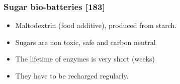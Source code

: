 \documentclass[a4paper,11pt,handout]{beamer}
\begin{document}
\begin{frame}
\frametitle{Sugar bio-batteries [183]}

\begin{itemize}

	\item Maltodextrin (food additive), produced from starch.
	\item Sugars are non toxic, safe and carbon neutral
	\item The lifetime of enzymes is very short (weeks)
	\item They have to be recharged regularly.

\end{itemize}
\end{frame}
\note{}
\end{document}
